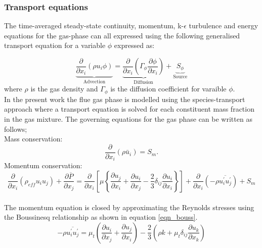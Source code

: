 \documentclass{webofc}
\begin{document}
\subsubsection{Transport equations}
The time-averaged steady-state continuity, momentum, k-$\epsilon$ turbulence  and energy equations for the gas-phase can all expressed using the following generalised transport equation for a variable $\phi$ expressed as:

\begin{equation}\label{eqn_general}
\underbrace{\frac{\partial}{\partial x_{i}}(\rho u_{i}\phi)}_{\text{Advection}}= \underbrace{\frac{\partial}{\partial x_{i}}(\Gamma_{\phi}\frac{\partial \phi}{\partial x_{i}})}_{\text{Diffusion}}+\underbrace{S_{\phi}}_{\text{Source}} 
\end{equation}
where $\rho$ is the gas density and $\Gamma_{\phi}$ is the diffusion coefficient for varaible $\phi$.\\

In the present work the flue gas phase is modelled using the species-transport approach where a transport equation is solved for each constituent mass fraction in the gas mixture. The governing equations for the gas phase can be written as follows;\\

Mass conservation:
\begin{equation}\label{eqn_RANS_mass}
\frac{\partial}{\partial x_{i}}(\rho \bar{u}_{i})=S_{m}.
\end{equation}
Momentum conservation:
\\
\begin{equation}\label{eqn_momentum}
\frac{\partial}{\partial x_{i}}(\rho_{eff} u_{i}u_{j})+\frac{\partial \overline{P}}{\partial x_{j}}=\frac{\partial}{\partial x_{i}}\left[\mu\left\{\frac{\partial u_{j}}{\partial x_{i}}+\frac{\partial u_{i}}{\partial x_{j}}-\frac{2}{3}\delta_{ij}\frac{\partial u_{i}}{\partial x_{i}}\right\}\right]+\frac{\partial}{\partial x_{i}}(-\rho\overline{u_{i}^{'}u_{j}^{'}})+S_m
\end{equation}\\

The momentum equation is closed by approximating the Reynolds stresses using the Boussinesq relationship as shown in equation \eqref{eqn_bouss}.
\begin{equation}\label{eqn_bouss}
-\rho\overline{u_{i}^{'}u_{j}^{'}}=\mu_{t}\left(\frac{\partial u_{i}}{\partial x_{j}}+\frac{\partial u_{j}}{\partial x_{i}}\right)-\frac{2}{3}\left(\rho k+\mu_{t}\delta_{ij}\frac{\partial u_{k}}{\partial x_{k}}\right)
\end{equation}
\end{document}
